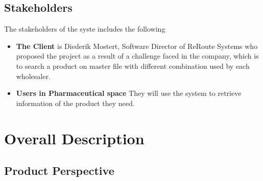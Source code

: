 \documentclass[a4paper,10pt]{article}
\begin{document}
	\subsection{Stakeholders}
	The stakeholders of the syste includes the following
	\begin{itemize}
	\item \textbf{The Client} is Diederik Mostert, Software Director of ReRoute Systems who proposed the project as a result of a challenge faced in the company, which is to search a product on master file with different combination used by each wholesaler.
	\item \textbf{Users in Pharmaceutical space} They will use the system to retrieve information of the product they need.
	\end{itemize}

	\newpage

\section{Overall Description}

\subsection{Product Perspective}
\end{document}
